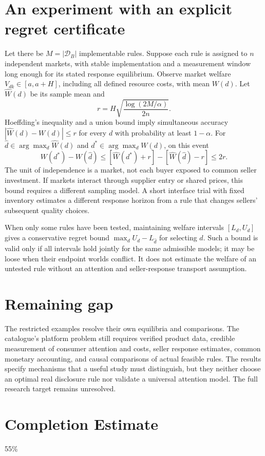 \documentclass[11pt,a4paper]{article}
\begin{document}
\section{An experiment with an explicit regret certificate}
Let there be $M=|\mathcal D_B|$ implementable rules. Suppose each rule is assigned to $n$ independent markets, with stable implementation and a measurement window long enough for its stated response equilibrium. Observe market welfare $V_{dk}\in[a,a+H]$, including all defined resource costs, with mean $W(d)$. Let $\widehat W(d)$ be its sample mean and
\[
 r=H\sqrt{\frac{\log(2M/\alpha)}{2n}}.
\]
Hoeffding's inequality and a union bound imply simultaneous accuracy $|\widehat W(d)-W(d)|\le r$ for every $d$ with probability at least $1-\alpha$. For $\widehat d\in\arg\max_d\widehat W(d)$ and $d^*\in\arg\max_dW(d)$, on this event
\[
 W(d^*)-W(\widehat d)
 \le [\widehat W(d^*)+r]-[\widehat W(\widehat d)-r]\le2r.
\]
The unit of independence is a market, not each buyer exposed to common seller investment. If markets interact through supplier entry or shared prices, this bound requires a different sampling model. A short interface trial with fixed inventory estimates a different response horizon from a rule that changes sellers' subsequent quality choices.

When only some rules have been tested, maintaining welfare intervals $[L_d,U_d]$ gives a conservative regret bound $\max_dU_d-L_{\widehat d}$ for selecting $\widehat d$. Such a bound is valid only if all intervals hold jointly for the same admissible models; it may be loose when their endpoint worlds conflict. It does not estimate the welfare of an untested rule without an attention and seller-response transport assumption.

\section{Remaining gap}
The restricted examples resolve their own equilibria and comparisons. The catalogue's platform problem still requires verified product data, credible measurement of consumer attention and costs, seller response estimates, common monetary accounting, and causal comparisons of actual feasible rules. The results specify mechanisms that a useful study must distinguish, but they neither choose an optimal real disclosure rule nor validate a universal attention model. The full research target remains unresolved.

\section{Completion Estimate}
55\%
\end{document}
